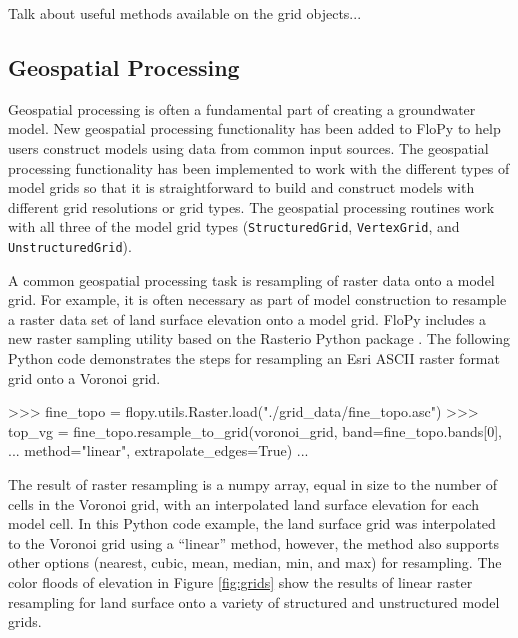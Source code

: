\documentclass[11pt, oneside]{article}   	%
\begin{document}
Talk about useful methods available on the grid objects...

\subsection{Geospatial Processing}

Geospatial processing is often a fundamental part of creating a groundwater model.  New geospatial processing functionality has been added to FloPy to help users construct models using data from common input sources.  The geospatial processing functionality has been implemented to work with the different types of model grids so that it is straightforward to build and construct models with different grid resolutions or grid types. The geospatial processing routines work with all three of the model grid types (\texttt{StructuredGrid}, \texttt{VertexGrid}, and \texttt{UnstructuredGrid}).  

A common geospatial processing task is resampling of raster data onto a model grid.  For example, it is often necessary as part of model construction to resample a raster data set of land surface elevation onto a model grid.  FloPy includes a new raster sampling utility based on the Rasterio Python package \citep{gillies_2019}.  The following Python code demonstrates the steps for resampling an Esri ASCII raster format grid onto a Voronoi grid.

\begin{python}
>>> fine_topo = flopy.utils.Raster.load("./grid_data/fine_topo.asc")
>>> top_vg = fine_topo.resample_to_grid(voronoi_grid, band=fine_topo.bands[0],
... method="linear", extrapolate_edges=True)
...
\end{python}

\noindent The result of raster resampling is a numpy array, equal in size to the number of cells in the Voronoi grid, with an interpolated land surface elevation for each model cell.  In this Python code example, the land surface grid was interpolated to the Voronoi grid using a ``linear'' method, however, the method also supports other options (nearest, cubic, mean, median, min, and max) for resampling.  The color floods of elevation in Figure \ref{fig:grids} show the results of linear raster resampling for land surface onto a variety of structured and unstructured model grids.
\end{document}
